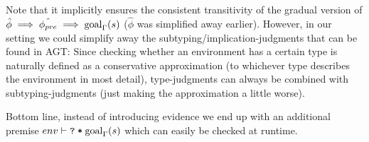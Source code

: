 \documentclass[11pt,a4paper]{article}
\begin{document}
\begin{description}
	Note that it implicitly ensures the consistent transitivity of the gradual version of $\hat{\phi} \implies \hat{\phi_{pre}} \implies \textrm{goal}_{\Gamma}(s)$ ($\hat{\phi}$ was simplified away earlier).
	However, in our setting we could simplify away the subtyping/implication-judgments that can be found in AGT:
	Since checking whether an environment has a certain type is naturally defined as a conservative approximation (to whichever type describes the environment in most detail), type-judgments can always be combined with subtyping-judgments (just making the approximation a little worse).
	
	Bottom line, instead of introducing evidence we end up with an additional premise $env \vdash \texttt{\texttt{?}\:*\:$\textrm{goal}_{\Gamma}(s)$}$ which can easily be checked at runtime.
\end{description}



\end{document}
